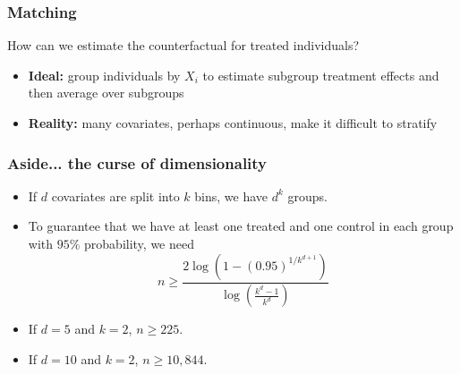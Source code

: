 \documentclass{beamer}
\begin{document}
\frame
{
\frametitle{Matching}
\begin{center}
How can we estimate the counterfactual for treated individuals? \\
\vfill
\begin{itemize}
\item \textbf{Ideal:} group individuals by $X_i$ to estimate subgroup treatment effects and then average over subgroups
\item \textbf{Reality:} many covariates, perhaps continuous, make it difficult to stratify
\end{itemize}
	

\end{center}
}



\frame
{
\frametitle{Aside... the curse of dimensionality }
\begin{center}
\vfill
\begin{itemize}
\item If $d$ covariates are split into $k$ bins, we have $d^k$ groups.
\item To guarantee that we have at least one treated and one control in each group with $95\%$ probability, we need
$$n \geq \frac{2 \log(1 - (0.95)^{1/k^{d+1}})}{\log(\frac{k^d - 1}{k^d})}$$
\item If $d = 5$ and $k = 2$, $n \geq 225$.\\
\item If $d = 10$ and $k = 2$, $n \geq 10,844$.
\end{itemize}
\end{center}

\begin{flushright}
\end{flushright}

}
	
\end{document}
